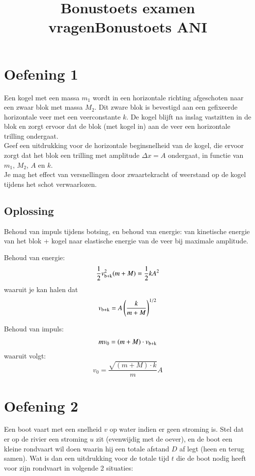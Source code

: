 \documentclass[11pt]{article}
\title{Bonustoets examen vragen}
\begin{document}
\title{Bonustoets ANI}


\section{Oefening 1}
Een kogel met een massa $m_1$ wordt in een horizontale richting afgeschoten naar een zwaar blok met massa $M_2$. Dit zware blok is bevestigd aan een gefixeerde horizontale veer met een veerconstante $k$.
De kogel blijft na inslag vastzitten in de blok en zorgt ervoor dat de blok (met kogel in) aan de veer een horizontale trilling ondergaat.\\
Geef een uitdrukking voor de horizontale beginsnelheid van de kogel, die ervoor zorgt dat het blok een trilling met amplitude $\Delta x = A$ ondergaat, in functie van $m_1$, $M_2$, $A$ en $k$.\\
Je mag het effect van versnellingen door zwaartekracht of weerstand op de kogel tijdens het schot verwaarlozen.


\subsection{Oplossing}
Behoud van impuls tijdens botsing, en behoud van energie: van kinetische energie van het blok + kogel naar elastische energie van de veer bij maximale amplitude.

Behoud van energie:
\begin{equation}
 	\frac{1}{2}  v_{\rm b+k}^{2} (m+M) = \frac{1}{2} k A^2
\end{equation}
waaruit je kan halen dat
\begin{equation}
	v_{\rm b+k} = A \left(\frac{k}{m+M}\right)^{1/2}
\end{equation}

Behoud van impuls:
\begin{equation}
	mv_0 = (m+M) \cdot v_{\rm b+k}
\end{equation}
waaruit volgt:
\begin{equation}
	v_0 = \frac{\sqrt{(m+M) \cdot k}}{m} A
\end{equation}

\section{Oefening 2}
Een boot vaart met een snelheid $v$ op water indien er geen stroming is.
Stel dat er op de rivier een stroming $u$ zit (evenwijdig met de oever), en de boot een kleine rondvaart wil doen waarin hij een totale afstand $D$ af legt (heen en terug samen). Wat is dan een uitdrukking voor de totale tijd $t$ die de boot nodig heeft voor zijn rondvaart in volgende 2 situaties:
\end{document}

